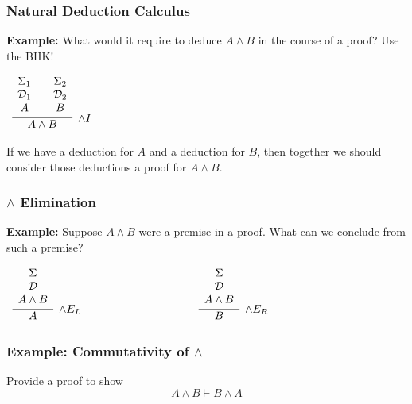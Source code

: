 \documentclass{beamer}
\theoremstyle{indentDefn} \newtheorem{defn}[]{Definition}
\begin{document}
\begin{frame}
	\frametitle{Natural Deduction Calculus}

	{\bf Example:} What would it require to deduce $A \land B$ in the course of a proof? Use the BHK!

	\pause
	\begin{center}
		$\begin{array}{ c  c  c }			
			\infer[\land I]{A \land B}
				{\begin{array}{ c  c  c }			
					\Sigma_{1} & & \Sigma_{2} \\
					\mathcal{D}_{1} & & \mathcal{D}_{2} \\
					A & & B 
				\end{array}}
		\end{array}$
	\end{center}

	If we have a deduction for $A$ and a deduction for $B$, then together we should consider those deductions a proof for $A \land B$.	
\end{frame}

\begin{frame}
	\frametitle{$\land$ Elimination}
	
	{\bf Example:} Suppose $A\land B$ were a premise in a proof. What can we conclude from such a premise?
	
	\pause
	\vspace{2cm}
	
	\begin{center}
		$\begin{array} { c c c }
		\infer[\land E_{L}]{A}
			{\begin{array}{c} \Sigma \\ \mathcal{D} \\ A \land B \end{array}}
		& \hspace{3cm} &
		\infer[\land E_{R}]{B}
			{\begin{array}{c} \Sigma \\ \mathcal{D} \\ A \land B \end{array}}
		\end{array}$
	\end{center}	
\end{frame}

\begin{frame}
	\frametitle{Example: Commutativity of $\land$}
	
	Provide a proof to show $$A \land B \vdash B \land A$$
		
	\vspace{6cm}
	
\end{frame}
\end{document}

